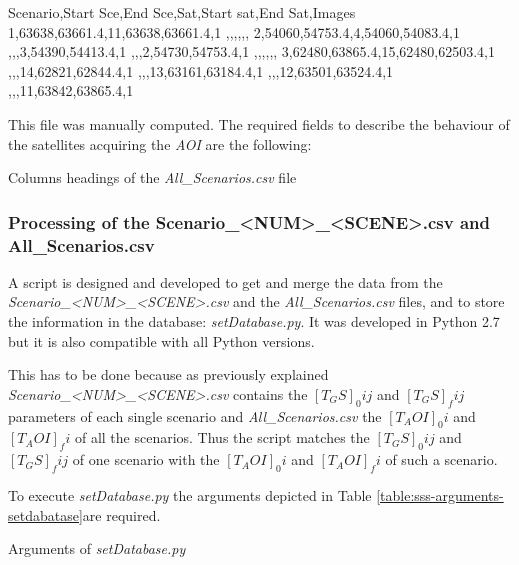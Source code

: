 \begin{itemize}
\begin{listing}[
  float=h!,
  caption  = {Extract of the \emph{All\_Scenarios.csv} code of the Lorca scenario},
  label    = code:sss-all-scenarios]

Scenario,Start Sce,End Sce,Sat,Start sat,End Sat,Images
1,63638,63661.4,11,63638,63661.4,1
,,,,,,
2,54060,54753.4,4,54060,54083.4,1
,,,3,54390,54413.4,1
,,,2,54730,54753.4,1
,,,,,,
3,62480,63865.4,15,62480,62503.4,1
,,,14,62821,62844.4,1
,,,13,63161,63184.4,1
,,,12,63501,63524.4,1
,,,11,63842,63865.4,1
\end{listing}

This file was manually computed. The required fields to describe the behaviour of the satellites acquiring the \emph{AOI} are the following:

\begin{table}[hp]
  \centering
  {\small
  
  }
  \caption{Columns headings of the \emph{All\_Scenarios.csv} file}
  \label{table:sss-all-scenarios}
\end{table}

\end{itemize}


\subsubsection{Processing of the Scenario\_<NUM>\_<SCENE>.csv and
 All\_Scenarios.csv}
\label{subsubsec:processing-files}

A script is designed and developed to get and merge the data from the \emph{Scenario\_<NUM>\_<SCENE>.csv} and the \emph{All\_Scenarios.csv} files, and to store the information in the database:  \emph{setDatabase.py}. It was developed in Python 2.7 but it is also compatible with all Python versions.

This has to be done because as previously explained
\emph{Scenario\_<NUM>\_<SCENE>.csv} contains the $[T_GS]_0ij$ and $[T_GS]_fij$
parameters of each single scenario and \emph{All\_Scenarios.csv} the
$[T_AOI]_0i$ and $[T_AOI]_fi$ of all the scenarios. Thus the script matches the
$[T_GS]_0ij$ and $[T_GS]_fij$ of one scenario with the $[T_AOI]_0i$ and $[T_AOI]_fi$ of such a scenario.

To execute \emph{setDatabase.py} the arguments depicted in Table \ref{table:sss-arguments-setdabatase}are required.
\begin{table}[hp]
  \centering
  {\small
  
  }
  \caption{Arguments of \emph{setDatabase.py}}
  \label{table:sss-arguments-setdatabase}
\end{table}

